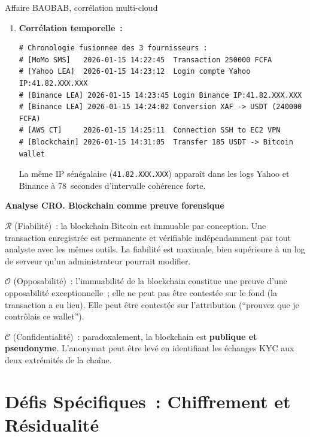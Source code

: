 \begin{boxscenario}{Affaire BAOBAB, corrélation multi-cloud}
\begin{enumerate}
    \item \textbf{Corrélation temporelle~:}
\begin{lstlisting}[language=bash_forensique]
# Chronologie fusionnee des 3 fournisseurs :
# [MoMo SMS]   2026-01-15 14:22:45  Transaction 250000 FCFA
# [Yahoo LEA]  2026-01-15 14:23:12  Login compte Yahoo IP:41.82.XXX.XXX
# [Binance LEA] 2026-01-15 14:23:45 Login Binance IP:41.82.XXX.XXX
# [Binance LEA] 2026-01-15 14:24:02 Conversion XAF -> USDT (240000 FCFA)
# [AWS CT]     2026-01-15 14:25:11  Connection SSH to EC2 VPN
# [Blockchain] 2026-01-15 14:31:05  Transfer 185 USDT -> Bitcoin wallet
\end{lstlisting}
          La même IP sénégalaise (\texttt{41.82.XXX.XXX}) apparaît
          dans les logs Yahoo et Binance à 78~secondes d'intervalle
          cohérence forte.
    \end{enumerate}
\end{boxscenario}

\begin{boxCRO}
\textbf{Analyse CRO. Blockchain comme preuve forensique}

$\mathcal{R}$ (Fiabilité)~: la blockchain Bitcoin est immuable par
conception. Une transaction enregistrée est permanente et vérifiable
indépendamment par tout analyste avec les mêmes outils. La fiabilité
est maximale, bien supérieure à un log de serveur qu'un administrateur
pourrait modifier.

$\mathcal{O}$ (Opposabilité)~: l'immuabilité de la blockchain constitue
une preuve d'une opposabilité exceptionnelle~; elle ne peut pas être
contestée sur le fond (la transaction a eu lieu). Elle peut être
contestée sur l'attribution (``prouvez que je contrôlais ce wallet'').

$\mathcal{C}$ (Confidentialité)~: paradoxalement, la blockchain est
\textbf{publique et pseudonyme}. L'anonymat peut être levé en
identifiant les échanges KYC aux deux extrémités de la chaîne.

\end{boxCRO}

\section{Défis Spécifiques~: Chiffrement et Résidualité}
\label{sec:defis-cloud}

